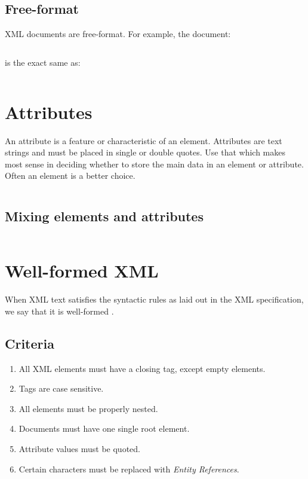 \documentclass[slides]{pgnotes}
\begin{document}
\subsection{Free-format}

XML documents are free-format.
For example, the document:

\inputminted{xml}{free-format-condensed.xml}
  
is the exact same as:
  
\inputminted{xml}{free-format-expanded.xml}


\section{Attributes}

An attribute is a feature or characteristic of an element. Attributes are text strings and must be placed in single or double quotes. 
Use that which makes most sense in deciding whether to store the main data in an element or attribute.
Often an element is a better choice.

\inputminted{xml}{attribute.xml}


\subsection{Mixing elements and attributes}

\inputminted{xml}{mixing.xml}



\section{Well-formed XML}

When XML text satisfies the syntactic rules as laid out in the XML specification, we say that it is well-formed \citep{goldfarb:2003:the-xml-handbook}.

\subsection{Criteria}

\begin{enumerate}
\item All XML elements must have a closing tag, except empty elements. 
\item Tags are case sensitive.
\item All elements must be properly nested.
\item Documents must have one single root element.
\item Attribute values must be quoted.
\item Certain characters must be replaced with \textit{Entity References}. 
\end{enumerate}
\end{document}
